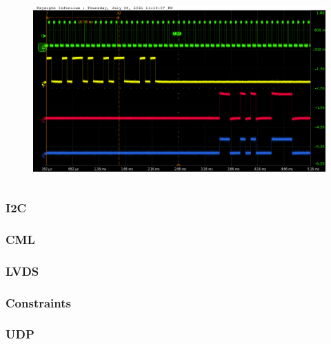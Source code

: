 \documentclass[aspectratio=169]{beamer}
\begin{document}
\begin{frame}[noframenumbering]
\begin{columns}
\begin{center}
\begin{figure}
				\caption{}
			\end{figure}
			\begin{figure}
				\includegraphics[width=0.95 \textwidth]{IMG/probe/09-08-2021_ch05-read60-baselinedac1.png}
				\caption{}
			\end{figure}	
		\end{center}
	\end{columns}
		\end{frame}
	
	\begin{frame}[noframenumbering]
		\frametitle{I2C}
	\end{frame}

	\begin{frame}[noframenumbering]
		\frametitle{CML}
	\end{frame}

	\begin{frame}[noframenumbering]
		\frametitle{LVDS}
	\end{frame}

	\begin{frame}[noframenumbering]
		\frametitle{Constraints}
	\end{frame}

	\begin{frame}[noframenumbering]
		\frametitle{UDP}
	\end{frame}
\end{document}
